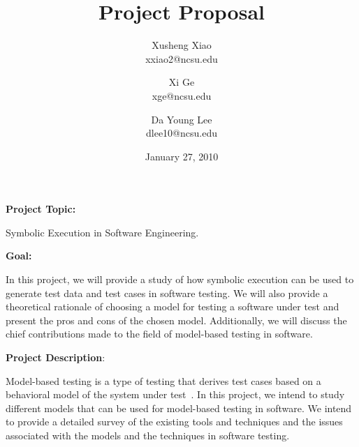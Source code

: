 \documentclass[times, 10pt,onecolumn]{article}
\title{Project Proposal}
\author{
Xusheng Xiao\\
\small{xxiao2@ncsu.edu}\\
\and
Xi Ge\\
\small{xge@ncsu.edu}\\
\and
Da Young Lee\\
\small{dlee10@ncsu.edu}
}
\date{January 27, 2010}
\begin{document}
\maketitle

\begin{flushleft}
\textbf{Project Topic:}\end{flushleft} Symbolic Execution in Software Engineering.\\

\begin{flushleft}
\textbf{Goal:}\end{flushleft}In this project, we will provide a study of how symbolic execution can be used to generate test data and test cases in software testing. We will also provide a theoretical rationale of choosing a model for testing a software under test and present the pros and cons of the chosen model. Additionally, we will discuss the chief contributions made to the field of model-based testing in software.\\

\begin{flushleft}
\textbf{Project Description}:\end{flushleft}Model-based testing is a type of testing that derives test cases based on a behavioral model of the system under test~\cite{Utting2006}. In this project, we intend to study different models that can be used for model-based testing in software. We intend to provide a detailed survey of the existing tools and techniques and the issues associated with the models and the techniques in software testing.
\end{document}
